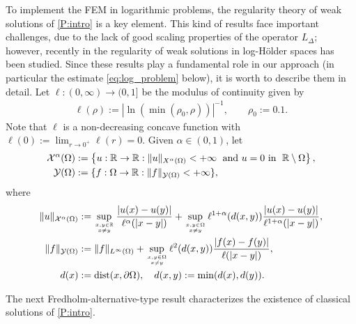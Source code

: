 \documentclass[10 pt]{article}
\numberwithin{equation}{section}
\def\dist{\operatorname{dist}}
\def\R{\mathbb{R}}
\begin{document}
To implement the FEM in logarithmic problems, the regularity theory of weak solutions of \eqref{P:intro} is a key element. This kind of results face important challenges, due to the lack of good scaling properties of the operator $L_\Delta$; however, recently in \cite{CS22} the regularity of weak solutions in log-Hölder spaces has been studied.  Since these results play a fundamental role in our approach (in particular the estimate \eqref{eq:log_problem} below), it is worth to describe them in detail. Let $\ell:(0,\infty)\to (0,1]$ be the modulus of continuity given by
\begin{align}\label{ell:def}
\ell(\rho) := |\ln(\min(\rho_0,\rho))|^{-1}, \qquad\rho_0:=0.1.
\end{align}
Note that $\ell$ is a non-decreasing concave function with $\ell(0) := \lim_{r\to0^+}\ell(r)=0$. Given $\alpha\in(0,1)$, let
%
\begin{align*}
    \mathcal X^\alpha(\Omega)&:=\left\{u:\mathbb R\to \mathbb R:\|u\|_{X^\alpha(\Omega)}<+\infty \;\textnormal{ and $u=0$ in }\; \R\setminus \Omega\right\}, \\
    \mathcal Y(\Omega)&:=\{f:\Omega\to \mathbb R:\|f\|_{\mathcal Y(\Omega)}<+\infty\},
\end{align*}
%
where
%
\begin{align*}
    \|u\|_{\mathcal X^\alpha(\Omega)}&:=\sup_{x,y\in\mathbb R \atop x\neq y}\frac{|u(x)-u(y)|}{\ell^{\alpha}(|x-y|)}+\sup_{x,y\in\Omega \atop x\neq y}\ell^{1+\alpha}(d(x,y))\frac{|u(x)-u(y)|}{\ell^{1+\alpha}(|x-y|)}, \\
    \|f\|_{\mathcal Y(\Omega)}&:=\|f\|_{L^\infty(\Omega)}+\sup_{x,y\in\Omega \atop x\neq y}\ell^{2}(d(x,y))\frac{|f(x)-f(y)|}{\ell(|x-y  |)}, \\
    d(x)&:=\dist(x,\partial \Omega), \quad d(x,y):=\min(d(x),d(y)).
\end{align*}

The next Fredholm-alternative-type result characterizes the existence of classical solutions of \eqref{P:intro}.
\end{document}
